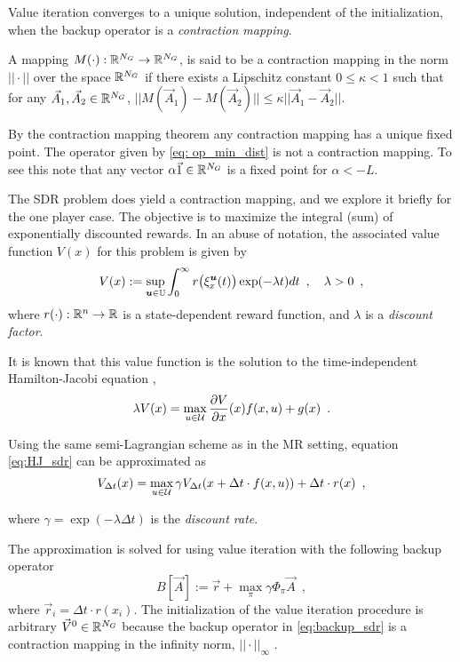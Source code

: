 Value iteration converges to a unique solution, independent of the initialization, when the backup operator is a \emph{contraction mapping}.  
%
\begin{definition} A mapping $M(\cdot): \mathbb{R}^{N_G} \rightarrow \mathbb{R}^{N_G}$, is said to be a contraction mapping in the norm $|| \cdot ||$ over the space $\mathbb{R}^{N_G}$ if there exists a Lipschitz constant $0\leq \kappa < 1$ such that for any $\vec{A}_1, \vec{A}_2 \in \mathbb{R}^{N_G}$, $||M(\vec{A}_1) - M(\vec{A}_2)|| \leq \kappa ||\vec{A}_1 - \vec{A}_2||$. 
\end{definition}

By the contraction mapping theorem any contraction mapping has a unique fixed point. The operator given by \eqref{eq: op_min_dist} is not a contraction mapping. To see this note that any vector $\alpha \vec{1} \in \mathbb{R}^{N_G}$ is a fixed point for $\alpha < -L$.

The SDR problem does yield a contraction mapping, and we explore it briefly for the one player case. The objective is to maximize the integral (sum) of exponentially discounted rewards. In an abuse of notation, the associated value function $V(x)$ for this problem is given by
%
\begin{equation}\label{eq:V_sum_rewards}
V(x) := \sup_{\bm{u} \in \mathbb{U}} \int_{0}^{\infty}r\big(\xi_{x}^{\bm{u}}(t)\big)\exp(-\lambda t) dt\enspace,  \quad \lambda >0 \enspace,
\end{equation}%
\noindent where $r(\cdot):\mathbb{R}^n \rightarrow \mathbb{R}$ is a state-dependent reward function, and $\lambda$ is a \emph{discount factor}.

It is known that this value function is the solution to the time-independent Hamilton-Jacobi equation \cite{Bardi2008},
%
\begin{equation} \label{eq:HJ_sdr}
\lambda V(x) = \max_{u\in\mathcal{U}} \frac{\partial V}{\partial x}(x) f(x, u)+ g(x)\enspace.
\end{equation}

Using the same semi-Lagrangian scheme as in the MR setting, equation \eqref{eq:HJ_sdr} can be approximated as
%
\begin{equation}
V_{\Delta t}(x) = \max_{u\in\mathcal{U}} \gamma V_{\Delta t}(x + \Delta t\cdot f(x, u))  + \Delta t \cdot r(x)\enspace,
\end{equation}
 
\noindent where $\gamma=\exp(-\lambda \Delta t)$ is the \emph{discount rate}.

The approximation is solved for using value iteration with the following backup operator
%
\begin{equation} \label{eq:backup_sdr}
B[\vec{A}] := \vec{r} +  \underset{\pi}{\max} \gamma \Phi_{\pi} \vec{A}\enspace,
\end{equation}%
\noindent where $\vec{r}_i =\Delta t \cdot r(x_i)$. The initialization of the value iteration procedure is arbitrary $\vec{V}^{0} \in \mathbb{R}^{N_G}$ because the backup  operator in \eqref{eq:backup_sdr} is a contraction mapping in the infinity norm, $||\cdot||_\infty$ \cite{Bertsekas1995}.

